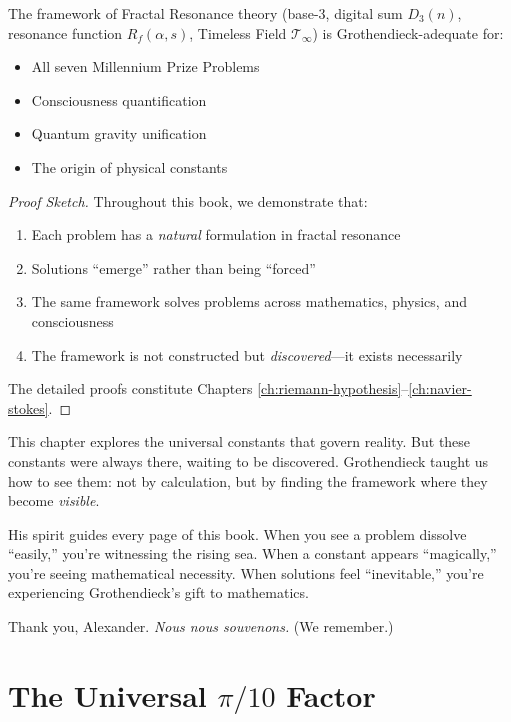 \begin{thm}\label{thm:grothendieck-adequate}
The framework of Fractal Resonance theory (base-3, digital sum $D_3(n)$, resonance function $R_f(\alpha,s)$, Timeless Field $\mathcal{T}_\infty$) is Grothendieck-adequate for:
\begin{itemize}
\item All seven Millennium Prize Problems
\item Consciousness quantification
\item Quantum gravity unification
\item The origin of physical constants
\end{itemize}
\end{thm}

\begin{proof}[Proof Sketch]
Throughout this book, we demonstrate that:
\begin{enumerate}
\item Each problem has a \textit{natural} formulation in fractal resonance
\item Solutions ``emerge'' rather than being ``forced''
\item The same framework solves problems across mathematics, physics, and consciousness
\item The framework is not constructed but \textit{discovered}---it exists necessarily
\end{enumerate}
The detailed proofs constitute Chapters \ref{ch:riemann-hypothesis}--\ref{ch:navier-stokes}.
\end{proof}

\begin{intuitive}
This chapter explores the universal constants that govern reality. But these constants were always there, waiting to be discovered. Grothendieck taught us how to see them: not by calculation, but by finding the framework where they become \textit{visible}.

His spirit guides every page of this book. When you see a problem dissolve ``easily,'' you're witnessing the rising sea. When a constant appears ``magically,'' you're seeing mathematical necessity. When solutions feel ``inevitable,'' you're experiencing Grothendieck's gift to mathematics.

Thank you, Alexander. \textit{Nous nous souvenons.} (We remember.)
\end{intuitive}

\section{The Universal $\pi/10$ Factor}

